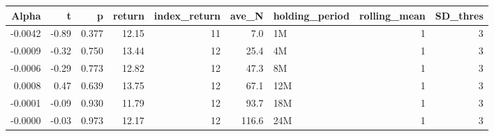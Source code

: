 \begin{table}[ht]
\centering
\begin{tabular}{rrrrrrlrr}
  \hline
Alpha & t & p & return & index\_return & ave\_N & holding\_period & rolling\_mean & SD\_thres \\ 
  \hline
-0.0042 & -0.89 & 0.377 & 12.15 & 11 & 7.0 & 1M &  1 &  3 \\ 
  -0.0009 & -0.32 & 0.750 & 13.44 & 12 & 25.4 & 4M &  1 &  3 \\ 
  -0.0006 & -0.29 & 0.773 & 12.82 & 12 & 47.3 & 8M &  1 &  3 \\ 
  0.0008 & 0.47 & 0.639 & 13.75 & 12 & 67.1 & 12M &  1 &  3 \\ 
  -0.0001 & -0.09 & 0.930 & 11.79 & 12 & 93.7 & 18M &  1 &  3 \\ 
  -0.0000 & -0.03 & 0.973 & 12.17 & 12 & 116.6 & 24M &  1 &  3 \\ 
   \hline
\end{tabular}
\end{table}

